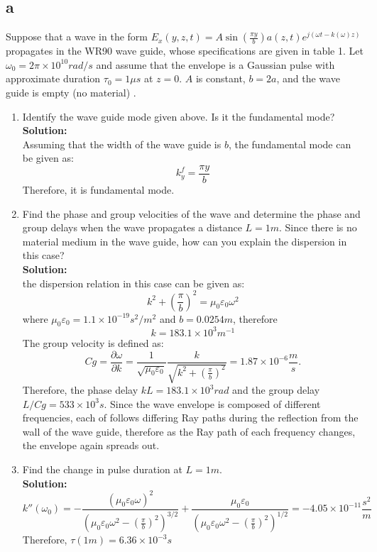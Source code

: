 \documentclass[11pt]{amsart}
\begin{document}
\subsection*{a}
Suppose that a wave in the form $E_x(y,z,t)=A \sin(\frac{\pi y}{b})a(z,t)e^{j(\omega t-k(\omega)z)}$ propagates in the WR90 wave guide, whose specifications are given in table 1. Let $\omega_0=2 \pi \times 10^{10} rad/s$ and assume that the envelope is a Gaussian pulse with approximate duration $\tau_0=1\mu s$ at $z=0$. $A$ is constant, $b=2a$, and the wave guide is empty (no material)   .
\begin{enumerate}
\item Identify the wave guide mode given above. Is it the fundamental mode?
\\
\textbf{Solution:}\\
Assuming that the width of the wave guide is $b$, the fundamental mode can be given as:
\begin{equation}
k_{y}^f=\frac{\pi y}{b}
\end{equation}
Therefore, it is fundamental mode.
\item Find the phase and group velocities of the wave and determine the phase and group delays when the wave propagates a distance $L=1m$. Since there is no material medium in the wave guide, how can you explain the dispersion in this case?
\\
\textbf{Solution:}\\
the dispersion relation in this case can be given as:
\begin{equation}
k^2+(\frac{\pi}{b})^2=\mu_0 \varepsilon_0 \omega^2
\end{equation}
where $\mu_0 \varepsilon_0=1.1 \times 10^{-19} s^2/m^2$ and $b=0.0254m$, therefore
\begin{equation}
k=183.1\times 10^3 m^{-1}
\end{equation}
The group velocity is defined as:
\begin{equation}
Cg=\frac{\partial \omega}{\partial k}=\frac{1}{\sqrt{\mu_0 \varepsilon_0}}\frac{k}{\sqrt{k^2+(\frac{\pi}{b})^2}}=1.87 \times 10^{-6}\frac{m}{s}.
\end{equation}
Therefore, the phase delay $kL=183.1\times 10^3 rad$ and the group delay $L/Cg=533\times 10^{3}s$. Since the wave envelope is composed of different frequencies, each of follows differing Ray paths during the reflection from the wall of the wave guide, therefore as the Ray path of each frequency changes, the envelope again spreads out.
\item Find the change in pulse duration at $L=1m$.
\\
\textbf{Solution:}\\
\begin{equation}
k''(\omega_0)=-\frac{(\mu_0 \varepsilon_0 \omega)^2}{(\mu_0 \varepsilon_0 \omega^2-(\frac{\pi}{b})^2)^{3/2}}+\frac{\mu_0 \varepsilon_0 }{(\mu_0 \varepsilon_0 \omega^2-(\frac{\pi}{b})^2)^{1/2}}=-4.05\times 10^{-11}\frac{s^2}{m}
\end{equation}
Therefore, $\tau(1m)=6.36\times 10^{-3}s$

\end{enumerate}
\end{document}
